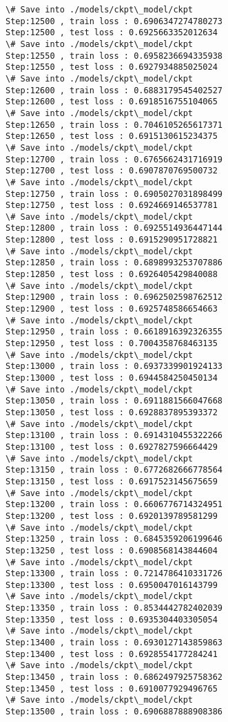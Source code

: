 \documentclass[11pt]{article}
\begin{document}
\begin{Verbatim}[commandchars=\\\{\}]
\# Save into ./models/ckpt\_model/ckpt
Step:12500 , train loss : 0.6906347274780273
Step:12500 , test loss : 0.6925663352012634
\# Save into ./models/ckpt\_model/ckpt
Step:12550 , train loss : 0.6958236694335938
Step:12550 , test loss : 0.6927934885025024
\# Save into ./models/ckpt\_model/ckpt
Step:12600 , train loss : 0.6883179545402527
Step:12600 , test loss : 0.6918516755104065
\# Save into ./models/ckpt\_model/ckpt
Step:12650 , train loss : 0.7046105265617371
Step:12650 , test loss : 0.6915130615234375
\# Save into ./models/ckpt\_model/ckpt
Step:12700 , train loss : 0.6765662431716919
Step:12700 , test loss : 0.6907870769500732
\# Save into ./models/ckpt\_model/ckpt
Step:12750 , train loss : 0.6905027031898499
Step:12750 , test loss : 0.6924669146537781
\# Save into ./models/ckpt\_model/ckpt
Step:12800 , train loss : 0.6925514936447144
Step:12800 , test loss : 0.6915290951728821
\# Save into ./models/ckpt\_model/ckpt
Step:12850 , train loss : 0.6898993253707886
Step:12850 , test loss : 0.6926405429840088
\# Save into ./models/ckpt\_model/ckpt
Step:12900 , train loss : 0.6962502598762512
Step:12900 , test loss : 0.6925748586654663
\# Save into ./models/ckpt\_model/ckpt
Step:12950 , train loss : 0.6618916392326355
Step:12950 , test loss : 0.7004358768463135
\# Save into ./models/ckpt\_model/ckpt
Step:13000 , train loss : 0.6937339901924133
Step:13000 , test loss : 0.6944584250450134
\# Save into ./models/ckpt\_model/ckpt
Step:13050 , train loss : 0.6911881566047668
Step:13050 , test loss : 0.6928837895393372
\# Save into ./models/ckpt\_model/ckpt
Step:13100 , train loss : 0.6914310455322266
Step:13100 , test loss : 0.6927827596664429
\# Save into ./models/ckpt\_model/ckpt
Step:13150 , train loss : 0.6772682666778564
Step:13150 , test loss : 0.6917523145675659
\# Save into ./models/ckpt\_model/ckpt
Step:13200 , train loss : 0.6606776714324951
Step:13200 , test loss : 0.6920139789581299
\# Save into ./models/ckpt\_model/ckpt
Step:13250 , train loss : 0.6845359206199646
Step:13250 , test loss : 0.6908568143844604
\# Save into ./models/ckpt\_model/ckpt
Step:13300 , train loss : 0.7214786410331726
Step:13300 , test loss : 0.6950047016143799
\# Save into ./models/ckpt\_model/ckpt
Step:13350 , train loss : 0.8534442782402039
Step:13350 , test loss : 0.6935304403305054
\# Save into ./models/ckpt\_model/ckpt
Step:13400 , train loss : 0.6930127143859863
Step:13400 , test loss : 0.6928554177284241
\# Save into ./models/ckpt\_model/ckpt
Step:13450 , train loss : 0.6862497925758362
Step:13450 , test loss : 0.6910077929496765
\# Save into ./models/ckpt\_model/ckpt
Step:13500 , train loss : 0.6906887888908386

\end{Verbatim}
\end{document}
